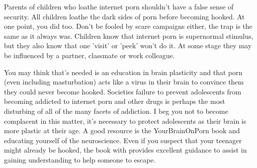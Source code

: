 \documentclass[easypeasy]{subfiles}
\begin{document}
Parents of children who loathe internet porn shouldn't have a false sense of security. All children loathe the dark sides of porn before becoming hooked. At one point, you did too. Don't be fooled by scare campaigns either, the trap is the same as it always was. Children know that internet porn is supernormal stimulus, but they also know that one 'visit' or 'peek' won't do it. At some stage they may be influenced by a partner, classmate or work colleague.

You may think that's needed is an education in brain plasticity and that porn (even including masturbation) acts like a virus in their brain to convince them they could never become hooked. Societies failure to prevent adolescents from becoming addicted to internet porn and other drugs is perhaps the most disturbing of all of the many facets of addiction. I beg you not to become complacent in this matter, it's necessary to protect adolescents as their brain is more plastic at their age. A good resource is the YourBrainOnPorn book and educating yourself of the neuroscience. Even if you suspect that your teenager might already be hooked, the book with provides excellent guidance to assist in gaining understanding to help someone to escape.
\end{document}
